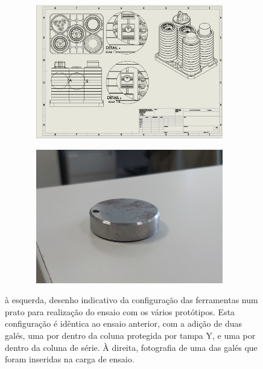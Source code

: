 \begin{figure}[htb!]
    \centering
    \begin{subfigure}{.5\textwidth}\
        \centering
        \includegraphics[width = 0.9\textwidth]{Figures/Cap3/Layout_ensaio_gallets.png}
        \caption{}
        \label{fig:ensaio_gales}  
    \end{subfigure}%
    \begin{subfigure}{.5\textwidth}\
        \centering
        \includegraphics[width = 0.9\textwidth]{Figures/Cap3/Gallets.png}
        \caption{}
        \label{fig:gales}  
    \end{subfigure}%
    \caption[Configuração do ensaio dos vários protótipos]%
    {à esquerda, desenho indicativo da configuração das ferramentas num prato para realização do ensaio com os vários protótipos. Esta configuração é idêntica ao ensaio anterior, com a adição de duas galés, uma por dentro da coluna protegida por tampa Y, e uma por dentro da coluna de série. À direita, fotografia de uma das galés que foram inseridas na carga de ensaio.}
\end{figure}
